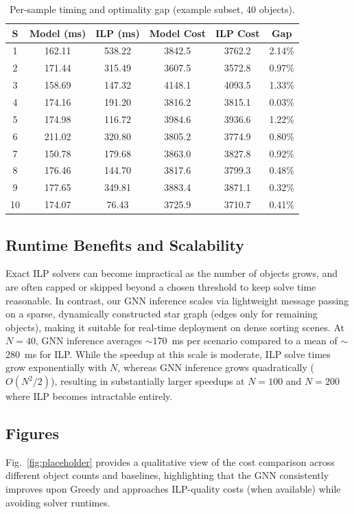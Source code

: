 \documentclass[conference]{IEEEtran}
\begin{document}
\begin{table}[htbp]
\caption{Per-sample timing and optimality gap (example subset, 40 objects).}
\label{tab:timing_ilp_gap}
\centering
\begin{tabular}{|c|c|c|c|c|c|}
\hline
\textbf{S} & \textbf{Model (ms)} & \textbf{ILP (ms)} & \textbf{Model Cost} & \textbf{ILP Cost} & \textbf{Gap} \\
\hline
1  & 162.11 & 538.22 & 3842.5 & 3762.2 & 2.14\% \\
2  & 171.44 & 315.49 & 3607.5 & 3572.8 & 0.97\% \\
3  & 158.69 & 147.32 & 4148.1 & 4093.5 & 1.33\% \\
4  & 174.16 & 191.20 & 3816.2 & 3815.1 & 0.03\% \\
5  & 174.98 & 116.72 & 3984.6 & 3936.6 & 1.22\% \\
6  & 211.02 & 320.80 & 3805.2 & 3774.9 & 0.80\% \\
7  & 150.78 & 179.68 & 3863.0 & 3827.8 & 0.92\% \\
8  & 176.46 & 144.70 & 3817.6 & 3799.3 & 0.48\% \\
9  & 177.65 & 349.81 & 3883.4 & 3871.1 & 0.32\% \\
10 & 174.07 & 76.43  & 3725.9 & 3710.7 & 0.41\% \\
\hline
\end{tabular}
\end{table}

\subsection{Runtime Benefits and Scalability}
Exact ILP solvers can become impractical as the number of objects grows, and are often capped or skipped beyond a chosen threshold to keep solve time reasonable.
In contrast, our GNN inference scales via lightweight message passing on a sparse, dynamically constructed star graph (edges only for remaining objects), making it suitable for real-time deployment on dense sorting scenes. At $N{=}40$, GNN inference averages $\sim$170~ms per scenario compared to a mean of $\sim$280~ms for ILP. While the speedup at this scale is moderate, ILP solve times grow exponentially with $N$, whereas GNN inference grows quadratically ($O(N^2/2)$), resulting in substantially larger speedups at $N{=}100$ and $N{=}200$ where ILP becomes intractable entirely.

\subsection{Figures}
Fig.~\ref{fig:placeholder} provides a qualitative view of the cost comparison across different object counts and baselines, highlighting that the GNN consistently improves upon Greedy and approaches ILP-quality costs (when available) while avoiding solver runtimes.
\end{document}
